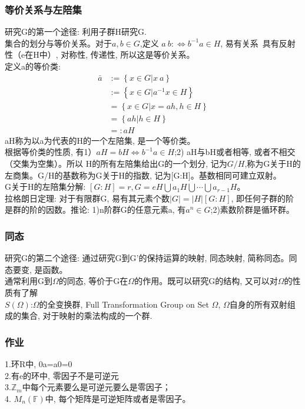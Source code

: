 \documentclass[UTF8]{../09-Mathematics}
\begin{document}
\subsubsection{等价关系与左陪集}
研究G的第一个途径: 利用子群H研究G.\\
集合的划分与等价关系。对于$a,b \in G$,定义 $a~b:\Leftrightarrow b^{-1}a \in H$, 易有关系~具有反射性（e在H中）, 对称性, 传递性, 所以这是等价关系。\\
定义a的等价类: 
\begin{equation}
\begin{split}
\bar a  & :=\left\{ x \in G |x~a \right\}\\
        &:=\left\{ x \in G | a^{-1}x \in H \right\}\\
        &= \left\{ x\in G | x=ah,h\in H \right\}\\
        & =\left\{ ah |h \in H \right\}\\
        &=:aH
\end{split}
\end{equation}
aH称为以a为代表的H的一个左陪集, 是一个等价类。\\
根据等价类的性质, 有1）$aH=bH \Leftrightarrow b^{-1}a \in H$;2) aH与bH或者相等, 或者不相交（交集为空集）。所以 H的所有左陪集给出G的一个划分, 记为$G/H$,称为G关于H的左商集。G/H的基数称为G关于H的指数, 记为[G:H]。基数相同可建立双射。\\
G关于H的左陪集分解: $[G:H]=r, G=eH \bigcup a_1H \bigcup \cdots \bigcup a_{r-1}H$。\\
拉格朗日定理: 对于有限群G, 易有其元素个数$|G|=|H|[G:H]$, 即任何子群的阶是群的阶的因数。推论: 1)n阶群G的任意元素a, 有$a^n \in G$;2)素数阶群是循环群。

\subsubsection{同态}
研究G的第二个途径: 通过研究G到G'的保持运算的映射, 同态映射, 简称同态。同态要变, 是函数。\\
通常利用G到$\Omega$的同态, 等价于G在$\Omega$的作用。既可以研究G的结构, 又可以对$\Omega$的性质有了解\\
$S(\Omega)$:$\Omega$的全变换群, Full Transformation Group on Set $\Omega$, $\Omega$自身的所有双射组成的集合, 对于映射的乘法构成的一个群.\\

\subsubsection{作业}
1.环R中, 0a=a0=0 \\
2.有e的环中, 零因子不是可逆元\\
3.$\mathbb Z_m$中每个元素要么是可逆元要么是零因子；\\
4. $M_n(\mathbb F)$中, 每个矩阵是可逆矩阵或者是零因子。
\end{document}

